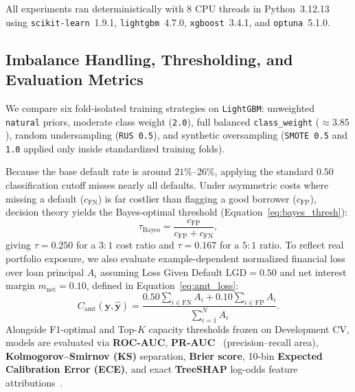 All experiments ran deterministically with $8$ CPU threads in Python~3.12.13 using \texttt{scikit-learn}~1.9.1, \texttt{lightgbm}~4.7.0, \texttt{xgboost}~3.4.1, and \texttt{optuna}~5.1.0.

\subsection{Imbalance Handling, Thresholding, and Evaluation Metrics}
We compare six fold-isolated training strategies on \texttt{LightGBM}: unweighted \texttt{natural} priors, moderate class weight (\texttt{2.0}), full balanced \texttt{class\_weight} ($\approx 3.85$), random undersampling (\texttt{RUS 0.5}), and synthetic oversampling (\texttt{SMOTE 0.5} and \texttt{1.0} applied only inside standardized training folds).

Because the base default rate is around $21\%$--$26\%$, applying the standard $0.50$ classification cutoff misses nearly all defaults. Under asymmetric costs where missing a default ($c_{\text{FN}}$) is far costlier than flagging a good borrower ($c_{\text{FP}}$), decision theory yields the Bayes-optimal threshold (Equation~\ref{eq:bayes_thresh}):
\begin{equation}
\label{eq:bayes_thresh}
  \tau_{\text{Bayes}} = \frac{c_{\text{FP}}}{c_{\text{FP}} + c_{\text{FN}}},
\end{equation}
giving $\tau = 0.250$ for a $3{:}1$ cost ratio and $\tau = 0.167$ for a $5{:}1$ ratio. To reflect real portfolio exposure, we also evaluate example-dependent normalized financial loss over loan principal $A_i$ assuming Loss Given Default $\mathrm{LGD} = 0.50$ and net interest margin $m_{\text{net}} = 0.10$, defined in Equation~\ref{eq:amt_loss}:
\begin{equation}
\label{eq:amt_loss}
  C_{\text{amt}}(\mathbf{y}, \hat{\mathbf{y}}) = \frac{0.50\sum_{i \in \mathrm{FN}} A_i + 0.10\sum_{i \in \mathrm{FP}} A_i}{\sum_{i=1}^{N} A_i}.
\end{equation}
Alongside F1-optimal and Top-$K$ capacity thresholds frozen on Development CV, models are evaluated via \textbf{ROC-AUC}, \textbf{PR-AUC}~\cite{saito2015} (precision--recall area), \textbf{Kolmogorov--Smirnov (KS)} separation, \textbf{Brier score}, 10-bin \textbf{Expected Calibration Error (ECE)}, and exact \textbf{TreeSHAP} log-odds feature attributions~\cite{lundberg2020}.
